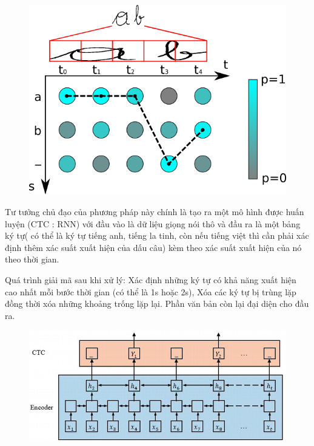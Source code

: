 \documentclass{article}
\begin{document}
	\begin{figure}[H]
		\centering
		\includegraphics[width=1\linewidth]{images/b3_5.png}
		\label{fig:writing-thesis}
	\end{figure} 
		
	Tư tưởng chủ đạo của phương pháp này chính là tạo ra một mô hình được huấn luyện (CTC : RNN) với đầu vào là dữ liệu giọng nói thô và đầu ra là một bảng ký tự( có thể là ký tự tiếng anh, tiếng la tinh, còn nếu tiếng việt thì cần phải xác định thêm xác suất xuất hiện của dấu câu) kèm theo xác suất xuất hiện của nó theo thời gian. 
	
	Quá trình giải mã sau khi xử lý: Xác định những ký tự có khả năng xuất hiện cao nhất mỗi bước thời gian (có thể là 1s hoặc 2s), Xóa các ký tự bị trùng lặp đồng thời xóa những khoảng trống lặp lại. Phần văn bản còn lại đại diện cho đầu ra.
	
	\begin{figure}[H]
		\centering
		\includegraphics[width=1\linewidth]{images/b3_6.png}
		\label{fig:writing-thesis}
	\end{figure} 
\end{document}
